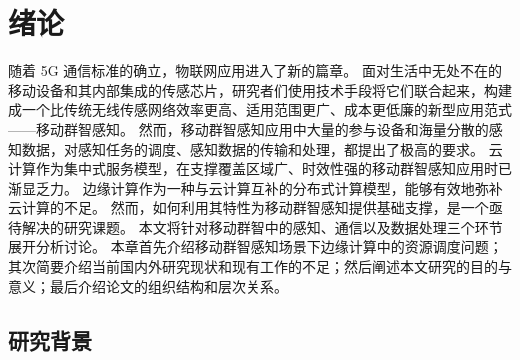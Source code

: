 

\chapter{绪论}


随着 5G 通信标准的确立，物联网应用进入了新的篇章。
面对生活中无处不在的移动设备和其内部集成的传感芯片，研究者们使用技术手段将它们联合起来，构建成一个比传统无线传感网络效率更高、适用范围更广、成本更低廉的新型应用范式——移动群智感知。
然而，移动群智感知应用中大量的参与设备和海量分散的感知数据，对感知任务的调度、感知数据的传输和处理，都提出了极高的要求。
云计算作为集中式服务模型，在支撑覆盖区域广、时效性强的移动群智感知应用时已渐显乏力。
边缘计算作为一种与云计算互补的分布式计算模型，能够有效地弥补云计算的不足。
然而，如何利用其特性为移动群智感知提供基础支撑，是一个亟待解决的研究课题。
本文将针对移动群智中的感知、通信以及数据处理三个环节展开分析讨论。
本章首先介绍移动群智感知场景下边缘计算中的资源调度问题；其次简要介绍当前国内外研究现状和现有工作的不足；然后阐述本文研究的目的与意义；最后介绍论文的组织结构和层次关系。

\section{研究背景}

